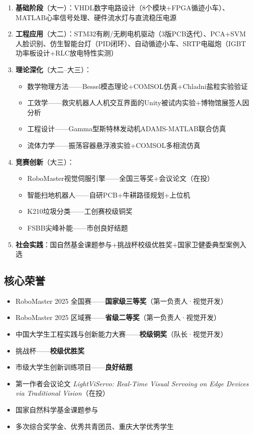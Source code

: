 \documentclass[12pt,a4paper]{ctexart}
\begin{document}
\begin{enumerate}
    \item \textbf{基础阶段}（大一）：VHDL数字电路设计（8个模块+FPGA循迹小车）、MATLAB心率信号处理、硬件流水灯与直流稳压电源
    \item \textbf{工程应用}（大二）：STM32有刷/无刷电机驱动（3版PCB迭代）、PCA+SVM人脸识别、仿生智能台灯（PID闭环）、自动循迹小车、SRTP电磁炮（IGBT功率板设计+RLC放电特性实测）
    \item \textbf{理论深化}（大二--大三）：
    \begin{itemize}
        \item 数学物理方法——Bessel模态理论+COMSOL仿真+Chladni盐粒实验验证
        \item 工效学——救灾机器人人机交互界面的Unity被试内实验+博物馆展签人因分析
        \item 工程设计——Gamma型斯特林发动机ADAMS-MATLAB联合仿真
        \item 流体力学——振荡容器悬浮液实验+COMSOL多相流仿真
    \end{itemize}
    \item \textbf{竞赛创新}（大三）：
    \begin{itemize}
        \item RoboMaster视觉伺服引擎——全国三等奖+会议论文（在投）
        \item 智能扫地机器人——自研PCB+牛耕路径规划+上位机
        \item K210垃圾分类——工创赛校级铜奖
        \item FSBB尖峰补能——市创良好结题
    \end{itemize}
    \item \textbf{社会实践}：国自然基金课题参与+挑战杯校级优胜奖+国家卫健委典型案例入选
\end{enumerate}

\subsection{核心荣誉}

\begin{resultbox}[竞赛与科研成果]
\begin{itemize}
    \item RoboMaster 2025 全国赛——\textbf{国家级三等奖}（第一负责人·视觉开发）
    \item RoboMaster 2025 区域赛——\textbf{省级二等奖}（第一负责人·视觉开发）
    \item 中国大学生工程实践与创新能力大赛——\textbf{校级铜奖}（队长·视觉开发）
    \item 挑战杯——\textbf{校级优胜奖}
    \item 市级大学生创新训练项目——\textbf{良好结题}
    \item 第一作者会议论文 \textit{LightViServo: Real-Time Visual Servoing on Edge Devices via Traditional Vision}（在投）
    \item 国家自然科学基金课题参与
    \item 多次综合奖学金、优秀共青团员、重庆大学优秀学生
\end{itemize}
\end{resultbox}
\end{document}
